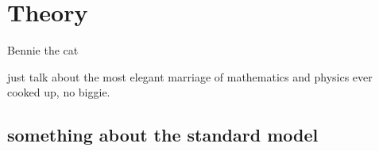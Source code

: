 \chapter{Theory}
\label{chap::Theory}

%
{Bennie the cat}

just talk about the most elegant marriage of mathematics and physics ever cooked up, no biggie.

\section{something about the standard model }
 